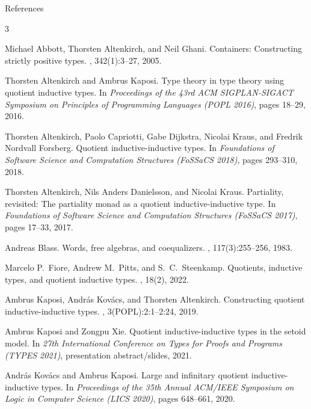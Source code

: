 \documentclass{beamer}
\begin{document}
\begin{frame}[allowframebreaks]{References}
  \tiny
  \begin{thebibliography}{3}

  Michael Abbott, Thorsten Altenkirch, and Neil Ghani.
  \newblock Containers: Constructing strictly positive types.
  , 342(1):3--27, 2005.

  Thorsten Altenkirch and Ambrus Kaposi.
  \newblock Type theory in type theory using quotient inductive types.
  \newblock In {\em Proceedings of the 43rd ACM SIGPLAN-SIGACT Symposium on
    Principles of Programming Languages (POPL 2016)}, pages 18--29, 2016.

  Thorsten Altenkirch, Paolo Capriotti, Gabe Dijkstra, Nicolai Kraus, and
  Fredrik Nordvall Forsberg.
  \newblock Quotient inductive-inductive types.
  \newblock In {\em Foundations of Software Science and Computation Structures
    (FoSSaCS 2018)}, pages 293--310, 2018.

  Thorsten Altenkirch, Nils Anders Danielsson, and Nicolai Kraus.
  \newblock Partiality, revisited: The partiality monad as a quotient inductive-inductive type.
  \newblock In {\em Foundations of Software Science and Computation Structures (FoSSaCS 2017)}, pages 17--33, 2017.

  Andreas Blass.
  \newblock Words, free algebras, and coequalizers.
  , 117(3):255--256, 1983.

  Marcelo P.~Fiore, Andrew M.~Pitts, and S.~C.~Steenkamp.
  \newblock Quotients, inductive types, and quotient inductive types.
  , 18(2), 2022.

  Ambrus Kaposi, Andr\'as Kov\'acs, and Thorsten Altenkirch.
  \newblock Constructing quotient inductive-inductive types.
  ,
    3(POPL):2:1--2:24, 2019.

  Ambrus Kaposi and Zongpu Xie.
  \newblock Quotient inductive-inductive types in the setoid model.
  \newblock In {\em 27th International Conference on Types for Proofs and
    Programs (TYPES 2021)}, presentation abstract/slides, 2021.

  Andr\'as Kov\'acs and Ambrus Kaposi.
  \newblock Large and infinitary quotient inductive-inductive types.
  \newblock In {\em Proceedings of the 35th Annual ACM/IEEE Symposium on Logic in
    Computer Science (LICS 2020)}, pages 648--661, 2020.


\end{thebibliography}
\end{frame}
\end{document}

